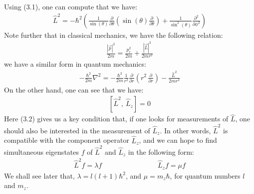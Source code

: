 \documentclass[11pt]{book}
\theoremstyle{break}
\theoremstyle{break}
\newcommand{\pd}{\partial}
\begin{document}
Using (3.1), one can compute that we have:
\begin{align*}
\hat{L}^2 = -\hbar^2 \left( \frac{1}{\sin(\theta)}\frac{\pd}{\pd \theta}\left( \sin(\theta) \frac{\pd}{\pd \theta}\right) + \frac{1}{\sin^2(\theta)}\frac{\pd^2}{\pd \phi^2}\right)
\end{align*}
Note further that in classical mechanics, we have the following relation:
\begin{align*}
\frac{|\vec{p}|^2}{2m} = \frac{p_r^2}{2m} + \frac{|\vec{L}|^2}{2mr^2}
\end{align*}
we have a similar form in quantum mechanics:
\begin{align*}
-\frac{\hbar^2}{2m}\nabla^2 = -\frac{\hbar^2}{2m}\frac{1}{r^2}\frac{\pd}{\pd r}\left(r^2\,\frac{\pd}{\pd r}\right) - \frac{\hat{L}^2}{2mr^2}
\end{align*}
On the other hand, one can see that we have:
\begin{align}
\left[ \hat{L}^2,\ \hat{L}_z\right] = 0
\end{align}
Here (3.2) gives us a key condition that, if one looks for measurements of $\hat{L}$, one should also be interested in the measurement of $\hat{L}_z$. In other words, $\hat{L}^2$ is compatible with the component operator $\hat{L}_z$, and we can hope to find simultaneous eigenstates $f$ of $\hat{L}^2$ and $\hat{L}_z$ in the following form:
\begin{align}
\hat{L}^2 f = \lambda f\qquad\qquad\qquad\qquad \hat{L}_zf = \mu f
\end{align}
We shall see later that, $\lambda = l(l+1)\hbar^2$, and $\mu = m_z\hbar$, for quantum numbers $l$ and $m_z$. \\
\end{document}
